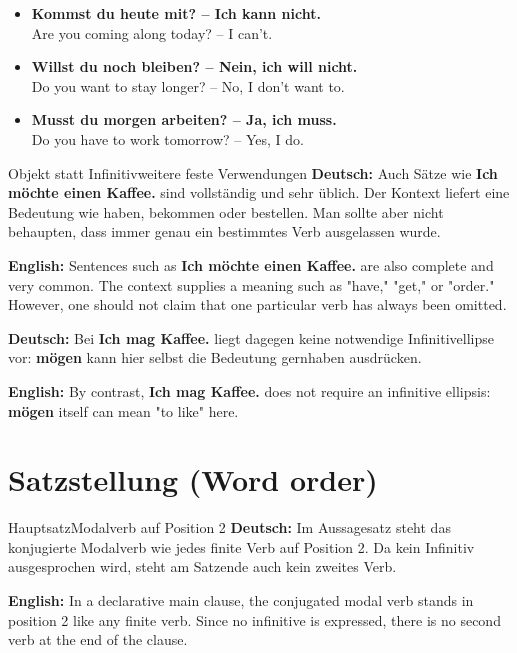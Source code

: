 \documentclass[a4paper,11pt]{article}
\newcommand{\GermanText}[1]{\textbf{Deutsch: }#1\par}
\newcommand{\EnglishText}[1]{{\small\color{SoftGray}\textbf{English: }#1\par}}
\newcommand{\ExampleItem}[2]{\item \textbf{#1}\\{\small\color{SoftGray}#2}}
\begin{document}
        \begin{exbox}
            \begin{itemize}
                \ExampleItem{Kommst du heute mit? -- Ich kann nicht.}{Are you coming along today? -- I can't.}
                \ExampleItem{Willst du noch bleiben? -- Nein, ich will nicht.}{Do you want to stay longer? -- No, I don't want to.}
                \ExampleItem{Musst du morgen arbeiten? -- Ja, ich muss.}{Do you have to work tomorrow? -- Yes, I do.}
            \end{itemize}
        \end{exbox}

        \begin{grammarentry}{Objekt statt Infinitiv}{weitere feste Verwendungen}
            \GermanText{Auch Sätze wie \textbf{Ich möchte einen Kaffee.} sind vollständig und sehr üblich. Der Kontext liefert eine Bedeutung wie \glqq haben\grqq{}, \glqq bekommen\grqq{} oder \glqq bestellen\grqq{}. Man sollte aber nicht behaupten, dass immer genau ein bestimmtes Verb ausgelassen wurde.}
            \EnglishText{Sentences such as \textbf{Ich möchte einen Kaffee.} are also complete and very common. The context supplies a meaning such as "have," "get," or "order." However, one should not claim that one particular verb has always been omitted.}

            \GermanText{Bei \textbf{Ich mag Kaffee.} liegt dagegen keine notwendige Infinitivellipse vor: \textbf{mögen} kann hier selbst die Bedeutung \glqq gernhaben\grqq{} ausdrücken.}
            \EnglishText{By contrast, \textbf{Ich mag Kaffee.} does not require an infinitive ellipsis: \textbf{mögen} itself can mean "to like" here.}
        \end{grammarentry}

    \section{Satzstellung \textnormal{(Word order)}}

        \begin{grammarentry}{Hauptsatz}{Modalverb auf Position 2}
            \GermanText{Im Aussagesatz steht das konjugierte Modalverb wie jedes finite Verb auf Position 2. Da kein Infinitiv ausgesprochen wird, steht am Satzende auch kein zweites Verb.}
            \EnglishText{In a declarative main clause, the conjugated modal verb stands in position 2 like any finite verb. Since no infinitive is expressed, there is no second verb at the end of the clause.}
        \end{grammarentry}
\end{document}

